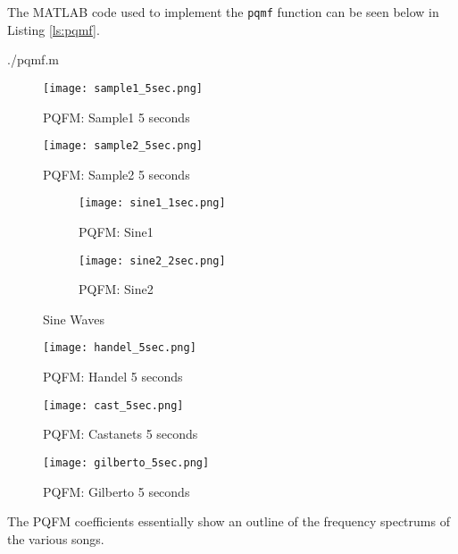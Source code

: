 \documentclass{article} %
\begin{document}
The MATLAB code used to implement the \verb|pqmf| function can be seen below
in Listing \ref{ls:pqmf}.  


{./pqmf.m} 


\begin{figure}[H]
\centering
\texttt{[image: sample1\_5sec.png]}
\caption{PQFM: Sample1 5 seconds}
\label{fig:samp1PQFM}
\end{figure}
\begin{figure}[H]
\centering
\texttt{[image: sample2\_5sec.png]}
\caption{PQFM: Sample2 5 seconds}
\label{fig:samp2PQFM}
\end{figure}

\begin{figure}[H]

\begin{subfigure}{0.5\textwidth}
\centering
\texttt{[image: sine1\_1sec.png]}
\caption{PQFM: Sine1}
\label{fig:sin1PQFM}
\end{subfigure}
\begin{subfigure}{0.5\textwidth}
\centering
\texttt{[image: sine2\_2sec.png]}
\caption{PQFM: Sine2}
\label{fig:sin2PQFM}
\end{subfigure}
\caption{Sine Waves}
\end{figure}


\begin{figure}[H]
\centering
\texttt{[image: handel\_5sec.png]}
\caption{PQFM: Handel 5 seconds}
\label{fig:handPQFM}
\end{figure}

\begin{figure}[H]
\centering
\texttt{[image: cast\_5sec.png]}
\caption{PQFM: Castanets 5 seconds}
\label{fig:castPQFM}
\end{figure}


\begin{figure}[H]
\centering
\texttt{[image: gilberto\_5sec.png]}
\caption{PQFM: Gilberto 5 seconds}
\label{fig:gilbPQFM}
\end{figure}




The PQFM coefficients essentially show an outline of the frequency spectrums
of the various songs. 
\end{document}
